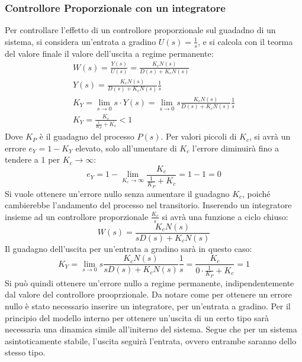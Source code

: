 \documentclass{article}
\numberwithin{equation}{subsection}
\begin{document}
\subsubsection{Controllore Proporzionale con un integratore}

Per controllare l'effetto di un controllore proporzionale sul guadadno di un sistema, si considera un'entrata a gradino $U(s)=\displaystyle\frac{1}{s}$, e si calcola con 
il teorma del valore finale il valore dell'uscita a regime permanente:
\begin{gather}
    W(s)=\displaystyle\frac{Y(s)}{U(s)}=\frac{K_cN(s)}{D(s)+K_cN(s)}\\
    Y(s)=\displaystyle\frac{K_c N(s)}{D(s)+K_c N(s)}\frac{1}{s}\\
    K_Y=\lim_{s\to0}s\cdot Y(s)=\lim_{s\to0}s\displaystyle\frac{K_c N(s)}{D(s)+K_c N(s)}\frac{1}{s}\\
    K_Y=\displaystyle\frac{K_c}{\displaystyle\frac{1}{K_P}+K_c}<1
\end{gather}
Dove $K_P$ è il guadagno del processo $P(s)$. Per valori piccoli di $K_c$, si avrà un errore $e_Y=1-K_Y$ elevato, solo all'umentare di $K_c$ l'errore diminuirà fino a tendere 
a $1$ per $K_c\to\infty$: 
\begin{equation}
    e_Y=1-\lim_{K_c\to\infty}\displaystyle\frac{K_c}{\displaystyle\frac{1}{K_P}+K_c}=1-1=0
\end{equation}
Si vuole ottenere un'errore nullo senza aumentare il guadagno $K_c$, poiché cambierebbe l'andamento del processo nel transitorio. Inserendo un integratore insieme ad 
un controllore proporzionale $\displaystyle\frac{K_c}{s}$ si avrà una funzione a ciclo chiuso:
\begin{equation}
    W(s)=\displaystyle\frac{K_cN(s)}{sD(s)+K_cN(s)}
\end{equation}
Il guadagno dell'uscita per un'entrata a gradino sarà in questo caso:
\begin{equation}
    K_Y=\lim_{s\to0}s\displaystyle\frac{K_c N(s)}{sD(s)+K_c N(s)}\frac{1}{s}=\frac{K_c}{0\cdot\displaystyle\frac{1}{K_P}+K_c}=1
\end{equation}
Si può quindi ottenere un'errore nullo a regime permanente, indipendentemente dal valore del controllore prooprzionale. Da notare come per ottenere un errore nullo è stato 
necessario inserire un integratore, per un'entrata a gradino. Per il principio del modello interno per ottenere un'uscita di un certo tipo sarà necessaria una dinamica 
simile all'initerno del sistema. Segue che per un sistema asintoticamente stabile, l'uscita seguirà l'entrata, ovvero entrambe saranno dello stesso tipo. 
\end{document}
